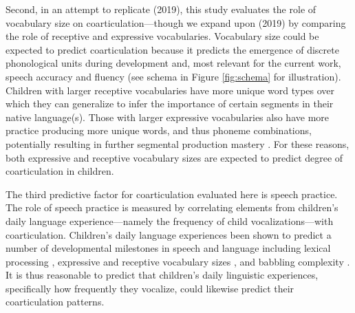 \documentclass[a4paper,man,natbib,donotrepeattitle, apacite]{apa6}
\begin{document}
Second, in an attempt to replicate \citeauthor{noiraySpokenLanguageDevelopment2019} (2019), this study evaluates the role of vocabulary size on coarticulation---though we expand upon \citeauthor{noiraySpokenLanguageDevelopment2019} (2019) by comparing the role of receptive and expressive vocabularies. Vocabulary size could be expected to predict coarticulation because it predicts the emergence of discrete phonological units during development \cite{edwardsInteractionVocabularySize2004,sosaLexicalPhonologicalEffects2012,stoel-gammonRelationshipsLexicalPhonological2011,storkelLexiconPhonologyInteractions2002} and, most relevant for the current work, speech accuracy and fluency \cite{cychoszLexicalAdvantageFouryearold2020,edwardsInteractionVocabularySize2004,metsalaYoungChildrenPhonological1999,munsonRelationshipsNonwordRepetition2005,zamunerPhonotacticProbabilitiesOnset2009} (see schema in Figure  \ref{fig:schema} for illustration). Children with larger receptive vocabularies have more unique word types over which they can generalize to infer the importance of certain segments in their native language(s). Those with larger expressive vocabularies also have more practice producing more unique words, and thus phoneme combinations, potentially resulting in further segmental production mastery \cite{beckmanGeneralizingLexiconsPredict2010}. For these reasons, both expressive and receptive vocabulary sizes are expected to predict degree of coarticulation in children. 

The third predictive factor for coarticulation evaluated here is speech practice. The role of speech practice is measured by correlating elements from children’s daily language experience---namely the frequency of child vocalizations---with coarticulation. Children's daily language experiences been shown to predict a number of developmental milestones in speech and language including lexical processing \cite{weislederTalkingChildrenMatters2013}, expressive and receptive vocabulary sizes \cite{hartMeaningfulDifferencesEveryday1995,hoffSpecificityEnvironmentalInfluence2003,mahrUsingLanguageInput2018}, and babbling complexity \cite{ferjanramirezParentCoaching102019}. It is thus reasonable to predict that children’s daily linguistic experiences, specifically how frequently they vocalize, could likewise predict their coarticulation patterns. 
\end{document}
